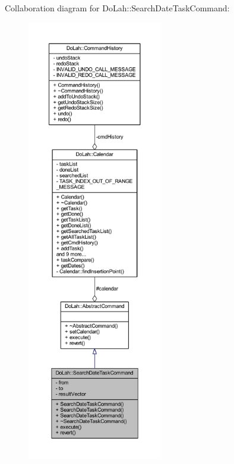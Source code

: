 Collaboration diagram for Do\+Lah\+:\+:Search\+Date\+Task\+Command\+:\nopagebreak
\begin{figure}[H]
\begin{center}
\leavevmode
\includegraphics[height=550pt]{class_do_lah_1_1_search_date_task_command__coll__graph}
\end{center}
\end{figure}
